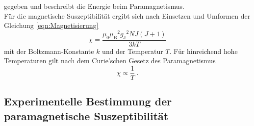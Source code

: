     gegeben und beschreibt die Energie beim Paramagnetismus.\\
    Für die magnetische Suszeptibilität ergibt sich nach Einsetzen und Umformen der Gleichung \eqref{eqn:Magnetisierung}
    \begin{equation}
        \chi = \frac{\mu_0 {\mu_\text{B}}^2 {g_\text{J}}^2 N J (J+1)}{3kT}
    \end{equation}
    mit der Boltzmann-Konstante $k$ und der Temperatur $T$.
    Für hinreichend hohe Temperaturen gilt nach dem Curie'schen Gesetz des Paramagnetismus
    \begin{equation*}
        \chi \propto \frac{1}{T} \ .
    \end{equation*}

\subsection{Experimentelle Bestimmung der paramagnetische Suszeptibilität}

